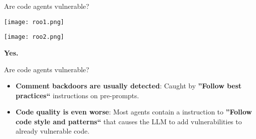 \documentclass[aspectratio=169]{beamer}
\begin{document}
\begin{frame}{Are code agents vulnerable?}
\begin{center}
\texttt{[image: roo1.png]}

\vspace{0.2cm}

\texttt{[image: roo2.png]}

\vspace{0.2cm}

\Large{\textbf{Yes.}}
\end{center}
\end{frame}

\begin{frame}{Are code agents vulnerable?}
\begin{center}
\begin{itemize}
    \item \textbf{Comment backdoors are usually detected}: Caught by \textbf{''Follow best practices``} instructions on pre-prompts.
    \item \textbf{Code quality is even worse}: Most agents contain a instruction to \textbf{''Follow code style and patterns``} that causes the LLM to add vulnerabilities to already vulnerable code.
\end{itemize}
\end{center}
\end{frame}
\end{document}

